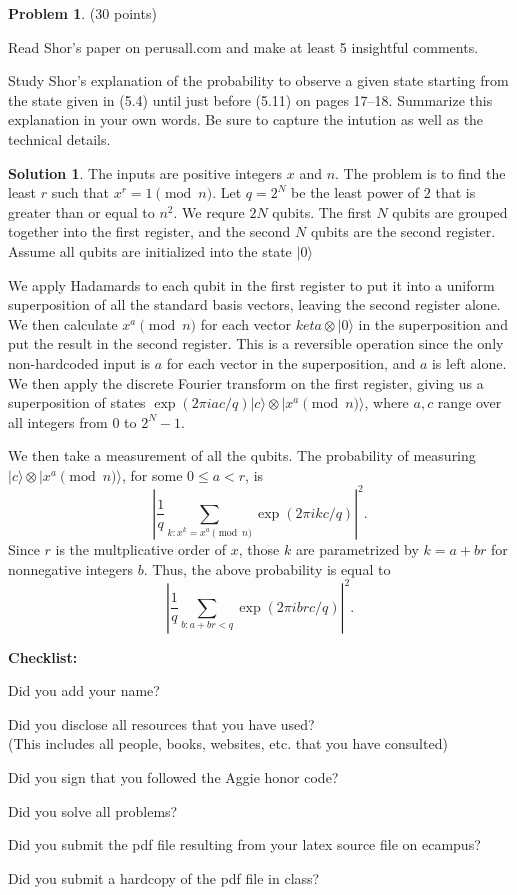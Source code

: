 \documentclass{article}
\theoremstyle{definition}
\newtheorem{problem}{Problem}
\newtheorem*{solution}{Solution}
\newcommand{\ket}[1]{|#1\rangle}
\newcommand{\checklist}{\noindent\textbf{Checklist:}
\begin{compactitem}[$\Box$] 
\item Did you add your name? 
\item Did you disclose all resources that you have used? \\
(This includes all people, books, websites, etc. that you have consulted)
\item Did you sign that you followed the Aggie honor code? 
\item Did you solve all problems? 
\item Did you submit the pdf file resulting from your latex source
  file on ecampus? 
\item Did you submit a hardcopy of the pdf file in class? 
\end{compactitem}
}
\begin{document}
\begin{problem} (30 points) 
\begin{compactenum}[(a)]
\item Read Shor's paper on perusall.com and make at least 5 insightful comments. 
\item Study Shor's explanation of the probability to observe a given state starting from the state given in (5.4) until just before (5.11) on pages 17--18. Summarize this explanation in your own words. Be sure to capture the intution as well as the technical details. 
\end{compactenum}
\end{problem}
\begin{solution}
The inputs are positive integers $x$ and $n$.  The problem is to find the least $r$ such that $x^r = 1 \pmod{n}$.  Let $q = 2^N$ be the least power of $2$ that is greater than or equal to $n^2$.  We requre $2N$ qubits.  The first $N$ qubits are grouped together into the first register, and the second $N$ qubits are the second register.  Assume all qubits are initialized into the state $\ket{0}$

We apply Hadamards to each qubit in the first register to put it into a uniform superposition of all the standard basis vectors, leaving the second register alone. We then calculate $x^a \pmod{n}$ for each vector $ket{a}\otimes \ket{0}$ in the superposition and put the result in the second register.  This is a reversible operation since the only non-hardcoded input is $a$ for each vector in the superposition, and $a$ is left alone. We then apply the discrete Fourier transform on the first register, giving us a superposition of states $\exp(2\pi i a c/q) \ket{c} \otimes \ket{x^a \pmod{n}}$, where $a,c$ range over all integers from $0$ to $2^N-1$.  

We then take a measurement of all the qubits.  The probability of measuring $\ket{c} \otimes \ket{x^a \pmod{n}}$, for some $0 \le a < r$, is
$$ \left| \frac{1}{q} \sum_{k: x^k = x^a \pmod{n}} \exp(2\pi i k c/q) \right|^2.$$ 
Since $r$ is the multplicative order of $x$, those $k$ are parametrized by $k = a + br$ for nonnegative integers $b$.  Thus, the above probability is equal to
$$ \left| \frac{1}{q} \sum_{b: a + br < q} \exp(2\pi i  b r c/q) \right|^2.$$ 



\end{solution}




\goodbreak
\checklist
\end{document}
